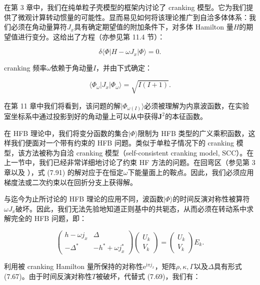 在第 3 章中，我们在纯单粒子壳模型的框架内讨论了 cranking 模型。它为我们提供了微观计算转动惯量的可能性。显而易见如何将该理论推广到自洽多体体系：我们必须在角动量算符$J_{x}$具有确定期望值的附加条件下，对多体
Hamilton 量$H$的期望值进行变分。这给出了方程（亦参见第 11.4 节）：

\begin{equation}
\delta\langle\Phi|H-\omega J_{x}|\Phi\rangle=0.\label{eq:cranking_variation_scc}
\end{equation}

cranking 频率$\omega$依赖于角动量$I$，并由下式确定：

\begin{equation}
\langle\Phi_{\omega}|J_{x}|\Phi_{\omega}\rangle=\sqrt{I(I+1)}.\label{eq:cranking_frequency_condition}
\end{equation}

在第 11 章中我们将看到，该问题的解$|\Phi_{\omega(I)}\rangle$必须被理解为内禀波函数，在实验室坐标系中通过投影到好的角动量上可以从中获得$\boldsymbol{J}^{2}$的本征函数。

在 HFB 理论中，我们将变分函数的集合$|\Phi\rangle$限制为 HFB 类型的广义乘积函数，这样我们便面对一个带有约束的
HFB 问题。类似于单粒子情况下的 cranking 模型，该方法被称为自洽 cranking 模型（self-consistent
cranking model, SCC）。在上一节中，我们已经非常详细地讨论了约束 HF 方法的问题。在回弯区（参见第 3 章以及
\cite{CMR75}），式 (7.91) 的解对应于在恒定$\omega$下能量面上的鞍点。因此，我们必须应用梯度法或二次约束以在回折分支上获得解。

与迄今为止所讨论的 HFB 理论的应用不同，波函数$|\Phi\rangle$的时间反演对称性被算符$\omega J_{x}$破坏。因此，我们无法先验地知道正则基中的共轭态，从而必须在转动系中求解完全的
HFB 问题\cite{RBM70}，即：

\begin{equation}
\begin{pmatrix}h-\omega j_{x} & \Delta\\
-\Delta^{*} & -h^{*}+\omega j^{*}_{x}
\end{pmatrix}\begin{pmatrix}U_{k}\\
V_{k}
\end{pmatrix}=\begin{pmatrix}U_{k}\\
V_{k}
\end{pmatrix}E_{k}.\label{eq:cranking_hfb_equation}
\end{equation}

利用被 cranking Hamilton 量所保持的对称性$\mathrm{e}^{\mathrm{i}\pi j_{x}}$，矩阵$\rho,\kappa,\Gamma$以及$\Delta$具有形式
(7.67)。由于时间反演对称性$T$被破坏，代替式 (7.69)，我们有：

